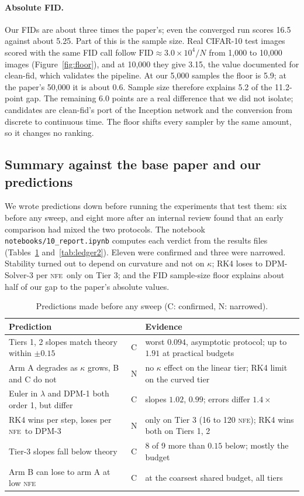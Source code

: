 \documentclass[sigconf]{acmart}
\newcommand{\NFE}{\textsc{nfe}}
\newcommand{\lam}{\lambda}
\begin{document}
\paragraph{Absolute FID.} Our FIDs are about three times the paper's; even the
converged run scores 16.5 against about 5.25. Part of this is the sample size. Real
CIFAR-10 test images scored with the same FID call follow
$\text{FID}\approx3.0\times10^4/N$ from 1,000 to 10,000 images (Figure~\ref{fig:floor}),
and at 10,000 they give 3.15, the value documented for clean-fid, which validates the
pipeline. At our 5,000 samples the floor is 5.9; at the paper's 50,000 it is about
0.6. Sample size therefore explains 5.2 of the 11.2-point gap. The remaining 6.0
points are a real difference that we did not isolate; candidates are clean-fid's port
of the Inception network and the conversion from discrete to continuous time. The
floor shifts every sampler by the same amount, so it changes no ranking.


\subsection{Summary against the base paper and our predictions}

We wrote predictions down before running the experiments that test them: six before
any sweep, and eight more after an internal review found that an early comparison had
mixed the two protocols. The notebook \texttt{notebooks/10\_report.ipynb} computes each verdict from the results files
(Tables~\ref{tab:ledger} and~\ref{tab:ledger2}). Eleven were confirmed and three were narrowed. Stability
turned out to depend on curvature and not on $\kappa$; RK4 loses to DPM-Solver-3 per
\NFE\ only on Tier 3; and the FID sample-size floor explains about half of our gap to
the paper's absolute values.

\begin{table}[!tb]
\caption{Predictions made before any sweep (C: confirmed, N: narrowed).}
\label{tab:ledger}
\footnotesize
\begin{tabular}{@{}p{3.55cm}c@{\hspace{5pt}}p{3.75cm}@{}}
\toprule
Prediction & & Evidence \\
\midrule
Tiers 1, 2 slopes match theory within $\pm0.15$ & C & worst $0.094$, asymptotic protocol; up to $1.91$ at practical budgets \\
Arm A degrades as $\kappa$ grows, B and C do not & N & no $\kappa$ effect on the linear tier; RK4 limit on the curved tier \\
Euler in $\lam$ and DPM-1 both order 1, but differ & C & slopes $1.02$, $0.99$; errors differ $1.4\times$ \\
RK4 wins per step, loses per \NFE\ to DPM-3 & N & only on Tier 3 (16 to 120 \NFE); RK4 wins both on Tiers 1, 2 \\
Tier-3 slopes fall below theory & C & 8 of 9 more than $0.15$ below; mostly the budget \\
Arm B can lose to arm A at low \NFE & C & at the coarsest shared budget, all tiers \\
\bottomrule
\end{tabular}
\end{table}
\end{document}
